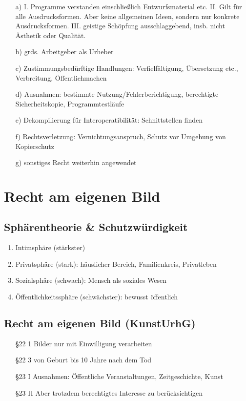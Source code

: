 \documentclass{article}
\begin{document}
\begin{itemize}
  \item[a)] I. Programme verstanden einschließlich Entwurfsmaterial etc.
        II. Gilt für alle Ausdrucksformen. Aber keine allgemeinen Ideen, sondern nur konkrete Ausdrucksformen.
        III. geistige Schöpfung ausschlaggebend, insb. nicht Ästhetik oder Qualität.
  \item[b)] grds. Arbeitgeber als Urheber
  \item[c)] Zustimmungsbedürftige Handlungen: Verfielfältigung, Übersetzung etc., Verbreitung, Öffentlichmachen
  \item[d)] Ausnahmen: bestimmte Nutzung/Fehlerberichtigung, berechtigte Sicherheitskopie, Programmtestläufe
  \item[e)] Dekompilierung für Interoperatibilität: Schnittstellen finden
  \item[f)] Rechtsverletzung: Vernichtungsanspruch, Schutz vor Umgehung von Kopierschutz
  \item[g)] sonstiges Recht weiterhin angewendet
\end{itemize}

\section{Recht am eigenen Bild}
\subsection{Sphärentheorie \& Schutzwürdigkeit}
\begin{enumerate}
  \item Intimsphäre (stärkster)
  \item Privatsphäre (stark): häuslicher Bereich, Familienkreis, Privatleben
  \item Sozialsphäre (schwach): Mensch als soziales Wesen
  \item Öffentlichkeitssphäre (schwächster): bewusst öffentlich
\end{enumerate}

\subsection{Recht am eigenen Bild (KunstUrhG)}
\begin{itemize}
  \item[§22 1] Bilder nur mit Einwilligung verarbeiten
  \item[§22 3] von Geburt bis 10 Jahre nach dem Tod
  \item[§23 I] Ausnahmen: Öffentliche Veranstaltungen, Zeitgeschichte, Kunst
  \item[§23 II] Aber trotzdem berechtigtes Interesse zu berücksichtigen
\end{itemize}
\end{document}
